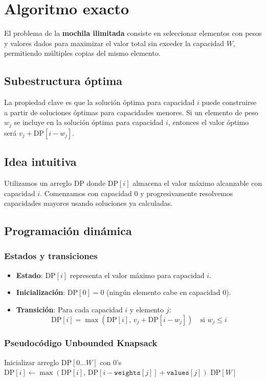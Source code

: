 \documentclass{report}
\begin{document}
\section{Algoritmo exacto}
El problema de la \textbf{mochila ilimitada} consiste en seleccionar elementos con pesos y valores dados para maximizar el valor total sin exceder la capacidad $W$, permitiendo múltiples copias del mismo elemento. 

\subsection*{Subestructura óptima}
La propiedad clave es que la solución óptima para capacidad $i$ puede construirse a partir de soluciones óptimas para capacidades menores. Si un elemento de peso $w_j$ se incluye en la solución óptima para capacidad $i$, entonces el valor óptimo será $v_j + \text{DP}[i - w_j]$.

\subsection*{Idea intuitiva}
Utilizamos un arreglo $\text{DP}$ donde $\text{DP}[i]$ almacena el valor máximo alcanzable con capacidad $i$. Comenzamos con capacidad 0 y progresivamente resolvemos capacidades mayores usando soluciones ya calculadas.

\subsection{Programación dinámica}
\subsubsection*{Estados y transiciones}
\begin{itemize}
    \item \textbf{Estado}: $\text{DP}[i]$ representa el valor máximo para capacidad $i$.
    \item \textbf{Inicialización}: $\text{DP}[0] = 0$ (ningún elemento cabe en capacidad 0).
    \item \textbf{Transición}: Para cada capacidad $i$ y elemento $j$:
        \[
        \text{DP}[i] = \max\left(\text{DP}[i],\, v_j + \text{DP}[i - w_j]\right) \quad \text{si } w_j \leq i
        \]
\end{itemize}

\subsubsection*{Pseudocódigo Unbounded Knapsack}
\begin{algorithm}
    \State Inicializar arreglo $\text{DP}[0 \dots W]$ con 0's
                \State $\text{DP}[i] \gets \max(\text{DP}[i],\, \text{DP}[i - \texttt{weights}[j]] + \texttt{values}[j])$
            \EndIf
        \EndFor
    \EndFor
    \State \Return $\text{DP}[W]$
\EndProcedure
\end{algorithm}
\end{document}
